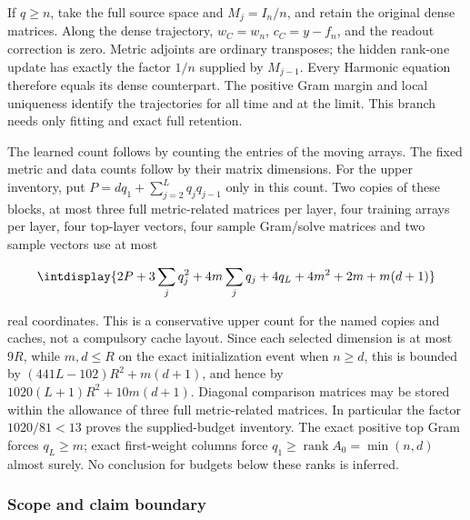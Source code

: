 
If \(q\ge n\), take the full source space and \(M_j=I_n/n\), and retain the original dense matrices. Along the dense trajectory, \(w_C=w_n\), \(c_C=y-f_n\), and the readout correction is zero. Metric adjoints are ordinary transposes; the hidden rank-one update has exactly the factor \(1/n\) supplied by \(M_{j-1}\). Every Harmonic equation therefore equals its dense counterpart. The positive Gram margin and local uniqueness identify the trajectories for all time and at the limit. This branch needs only fitting and exact full retention.



The learned count follows by counting the entries of the moving arrays. The fixed metric and data counts follow by their matrix dimensions. For the upper inventory, put \(P=dq_1+\sum_{j=2}^Lq_jq_{j-1}\) only in this count. Two copies of these blocks, at most three full metric-related matrices per layer, four training arrays per layer, four top-layer vectors, four sample Gram/solve matrices and two sample vectors use at most


\begingroup\renewcommand{\theHequation}{intdisplay.643}
\begin{equation*}
\intdisplay{
2P+3\sum_jq_j^2+4m\sum_jq_j+4q_L+4m^2+2m+m(d+1)
}
\end{equation*}
\endgroup


real coordinates. This is a conservative upper count for the named copies and caches, not a compulsory cache layout. Since each selected dimension is at most \(9R\), while \(m,\allowbreak d\le R\) on the exact initialization event when \(n\ge d\), this is bounded by \((441L-102)R^2+m(d+1)\), and hence by \(1020(L+1)R^2+10m(d+1)\). Diagonal comparison matrices may be stored within the allowance of three full metric-related matrices. In particular the factor \(1020/81<13\) proves the supplied-budget inventory. The exact positive top Gram forces \(q_L\ge m\); exact first-weight columns force \(q_1\ge\operatorname{rank}A_0=\min(n,\allowbreak d)\) almost surely. No conclusion for budgets below these ranks is inferred.


\subsubsection{Scope and claim boundary}
\label{int:compact-source-provenance}
\label{int:harmonic-source-provenance}

